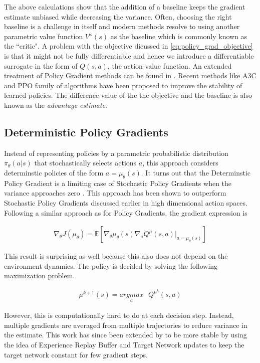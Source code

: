 \documentclass[12pt,a4paper]{article}
\begin{document}
The above calculations show that the addition of a baseline keeps the gradient estimate 
unbiased while decreasing the variance. Often, choosing the right baseline is a challenge in
itself and modern methods resolve to using another parametric value function $V^\omega(s)$
as the baseline which is commonly known as the ``critic". A problem with the objective 
dicussed in \ref{eq:policy_grad_objective} is that it might not be fully differentiable and hence 
we introduce a differentiable surrogate in the form of $Q(s,a)$, the action-value function. An
extended treatment of Policy Gradient methods can be found in \cite{Sutton:1998:IRL:551283}.
Recent methods like A3C \cite{pmlr-v48-mniha16} and PPO family of algorithms 
\cite{2017arXiv170706347S} have been proposed to improve the stability of learned policies.
The difference value of the the objective and the baseline is also known as the
\textit{advantage estimate}.

\subsection{Deterministic Policy Gradients} \label{section:dpg}

Instead of representing policies by a parametric probabilistic distribution $\pi_\theta(a|s)$ that
stochastically selects actions $a$, this approach considers determinstic policies of the form
$a = \mu_\theta(s)$. It turns out that the Determinstic Policy Gradient is a limiting case of
Stochastic Policy Gradients when the variance approaches zero \cite{pmlr-v32-silver14}. This
approach has been shown to outperform Stochastic Policy Gradients discussed earlier in
high dimensional action spaces. Following a similar approach as for Policy Gradients, the
gradient expression is

\begin{align}
\nabla_\theta J(\mu_\theta) = \mathbb{E}\left[ \nabla_\theta \mu_\theta(s) \nabla_a 
Q^\mu(s,a) \big|_{a = \mu_\theta(s)}  \right]
\end{align}

This result is surprising as well because this also does not depend on the environment 
dynamics. The policy is decided by solving the following maximization problem.

\begin{align}
\mu^{k+1}(s) = \underset{a}{argmax}\text{ }Q^{\mu^k}(s,a)
\end{align}

However, this is computationally hard to do at each decision step. Instead, multiple gradients 
are averaged from multiple trajectories to reduce variance in the estimate. This work has since
been extended by \cite{2015arXiv150902971L} to be more stable by using the idea of
Experience Replay Buffer and Target Network updates to keep the target network constant for 
few gradient steps.
\end{document}
